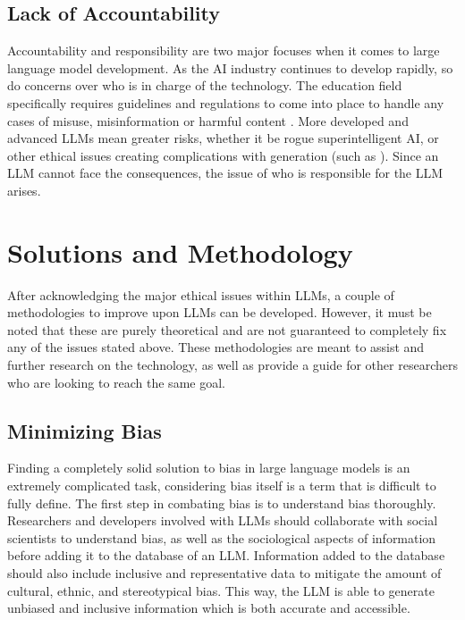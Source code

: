 \documentclass[12pt]{extarticle}
\begin{document}
\subsection{Lack of Accountability}
Accountability and responsibility are two major focuses when it comes to large language model development. As the AI industry continues to develop rapidly, so do concerns over who is in charge of the technology. The education field specifically requires guidelines and regulations to come into place to handle any cases of misuse, misinformation or harmful content \cite{tacklingdilemma}. More developed and advanced LLMs mean greater risks, whether it be rogue superintelligent AI, or other ethical issues creating complications with generation (such as \cite{khan2023ai, khan2022ethics}). Since an LLM cannot face the consequences, the issue of who is responsible for the LLM arises.

\section{Solutions and Methodology}
\label{solutionsandmethodology}
After acknowledging the major ethical issues within LLMs, a couple of methodologies to improve upon LLMs can be developed. However, it must be noted that these are purely theoretical and are not guaranteed to completely fix any of the issues stated above. These methodologies are meant to assist and further research on the technology, as well as provide a guide for other researchers who are looking to reach the same goal.

\subsection {Minimizing Bias}
Finding a completely solid solution to bias in large language models is an extremely complicated task, considering bias itself is a term that is difficult to fully define. The first step in combating bias is to understand bias thoroughly. Researchers and developers involved with LLMs should collaborate with social scientists to understand bias, as well as the sociological aspects of information before adding it to the database of an LLM. Information added to the database should also include inclusive and representative data to mitigate the amount of cultural, ethnic, and stereotypical bias. This way, the LLM is able to generate unbiased and inclusive information which is both accurate and accessible.
\end{document}
